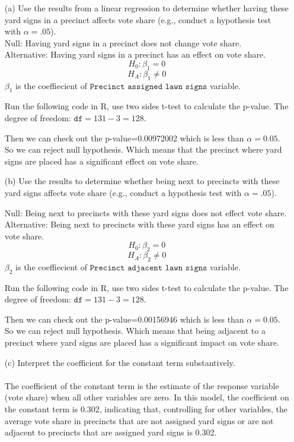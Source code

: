\documentclass[12pt,letterpaper]{article}
\begin{document}
\vspace{.5cm}
\begin{enumerate}
	\item [(a)] Use the results from a linear regression to determine whether having these yard signs in a precinct affects vote share (e.g., conduct a hypothesis test with $\alpha = .05$).\\
	
	\noindent Null: Having yard signs in a precinct does not change vote share.\\ Alternative: Having yard signs in a precinct has an effect on vote share.
	$$H_0: \beta_1 = 0$$
	$$H_A: \beta _1\neq 0$$
	\noindent $\beta_1$ is the coeffiecient of \(\texttt{Precinct assigned lawn signs} \) variable.
	
	\noindent Run the following code in R, use two sides t-test to calculate the p-value. The degree of freedom: \(\texttt{df}=131-3=128\).
								
	\noindent Then we can check out the  p-value=0.00972002 which is less than $\alpha=0.05$. So we can reject null hypothesis. Which means that the precinct where yard signs are placed has a significant effect on vote share.
	
	\item [(b)]  Use the results to determine whether being
	next to precincts with these yard signs affects vote
	share (e.g., conduct a hypothesis test with $\alpha = .05$).
		\vspace{.17cm}
	
	\noindent Null: Being next to precincts with these yard signs does not effect vote share.\\ Alternative: Being next to precincts with these yard signs has an effect on  vote share.
	$$H_0: \beta_2 = 0$$
	$$H_A: \beta _2 \neq 0$$
	\noindent $\beta_2$ is the coeffiecient of \(\texttt{Precinct adjacent lawn signs} \) variable.
	
	\noindent Run the following code in R, use two sides t-test to calculate the p-value. The degree of freedom: \(\texttt{df}=131-3=128\).
	
	\noindent Then we can check out the  p-value=0.00156946 which is less than $\alpha=0.05$. So we can reject null hypothesis. Which means that being adjacent to a precinct where yard signs are placed has a significant impact on vote share.
	
	\vspace{.17cm}
	\item [(c)] Interpret the coefficient for the constant term substantively.\\\\
	\noindent The coefficient of the constant term is the estimate of the response variable (vote share) when all other variables are zero. In this model, the coefficient on the constant term is 0.302, indicating that, controlling for other variables, the average vote share in precincts that are not assigned yard signs or are not adjacent to precincts that are assigned yard signs is 0.302.
	\vspace{.17cm}
	

\end{enumerate}
\end{document}
